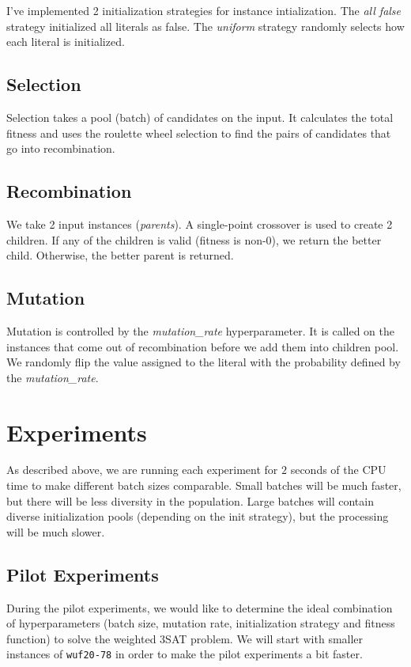 \documentclass[a4paper,10pt]{article}
\begin{document}
I've implemented 2 initialization strategies for instance intialization. The \emph{all false} strategy initialized all literals as false. The \emph{uniform} strategy randomly selects how each literal is initialized.

\subsection{Selection}

Selection takes a pool (batch) of candidates on the input. It calculates the total fitness and uses the roulette wheel selection to find the pairs of candidates that go into recombination.

\subsection{Recombination}

We take 2 input instances (\emph{parents}). A single-point crossover is used to create 2 children. If any of the children is valid (fitness is non-0), we return the better child. Otherwise, the better parent is returned.

\subsection{Mutation}

Mutation is controlled by the \emph{mutation\_rate} hyperparameter. It is called on the instances that come out of recombination before we add them into children pool. We randomly flip the value assigned to the literal with the probability defined by the \emph{mutation\_rate}.

\section{Experiments}

As described above, we are running each experiment for $2$ seconds of the CPU time to make different batch sizes comparable. Small batches will be much faster, but there will be less diversity in the population. Large batches will contain diverse initialization pools (depending on the init strategy), but the processing will be much slower.

\subsection{Pilot Experiments}

During the pilot experiments, we would like to determine the ideal combination of hyperparameters (batch size, mutation rate, initialization strategy and fitness function) to solve the weighted 3SAT problem. We will start with smaller instances of \lstinline{wuf20-78} in order to make the pilot experiments a bit faster.
\end{document}
